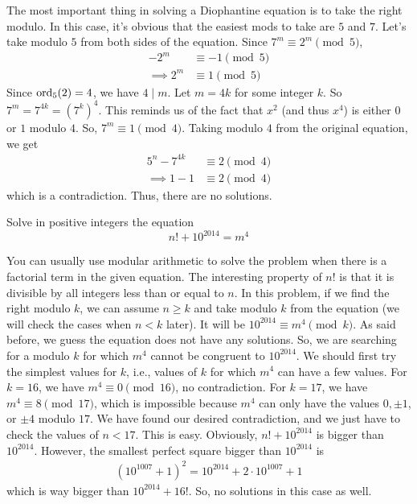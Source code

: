 \documentclass{subfile}
\begin{document}
				\begin{solution}
					The most important thing in solving a Diophantine equation is to take the right modulo. In this case, it's obvious that the easiest mods to take are $5$ and $7$. Let's take modulo $5$ from both sides of the equation. Since $7^m \equiv 2^m \pmod 5$,
						\begin{align*}
							-2^m
								& \equiv -1 \pmod 5\\
							\implies 2^m
								& \equiv 1 \pmod 5
						\end{align*}
					Since $\operatorname{ord}_5(2)=4$, we have $4 \mid m$. Let $m=4k$ for some integer $k$. So $7^m = 7^{4k}=\left(7^k\right)^4$. This reminds us of the fact that $x^2$ (and thus $x^4$) is either $0$ or $1$ modulo $4$. So, $7^m \equiv 1 \pmod 4$. Taking modulo $4$ from the original equation, we get
						\begin{align*}
							5^n - 7^{4k}
								& \equiv 2 \pmod 4\\
							\implies 1-1
								& \equiv 2 \pmod 4
						\end{align*}
					which is a contradiction. Thus, there are no solutions.
				\end{solution}

				\begin{problem}[Kazakhstan 2016]
					Solve in positive integers the equation
					\[n!+10^{2014}=m^4\]
				\end{problem}

				\begin{solution}
					You can usually use modular arithmetic to solve the problem when there is a factorial term in the given equation. The interesting property of $n!$ is that it is divisible by all integers less than or equal to $n$. In this problem, if we find the right modulo $k$, we can assume $n\geq k$ and take modulo $k$ from the equation (we will check the cases when $n < k$ later). It will be $10^{2014} \equiv m^4 \pmod k$. As said before, we guess the equation does not have any solutions. So, we are searching for a modulo $k$ for which $m^4$ cannot be congruent to $10^{2014}$. We should first try the simplest values for $k$, i.e., values of $k$ for which $m^4$ can have a few values. For $k=16$, we have $m^4 \equiv 0 \pmod{16}$, no contradiction. For $k=17$, we have $m^4 \equiv 8 \pmod{17}$, which is impossible because $m^4$ can only have the values $0, \pm 1$, or $\pm 4$ modulo $17$. We have found our desired contradiction, and we just have to check the values of $n < 17$. This is easy. Obviously, $n! + 10^{2014}$ is bigger than $10^{2014}$. However, the smallest perfect square bigger than $10^{2014}$ is
						\begin{align*}
							\left(10^{1007}+1\right)^2 = 10^{2014} + 2 \cdot 10^{1007} + 1
						\end{align*}
					which is way bigger than $10^{2014} + 16!$. So, no solutions in this case as well.
				\end{solution}
\end{document}

